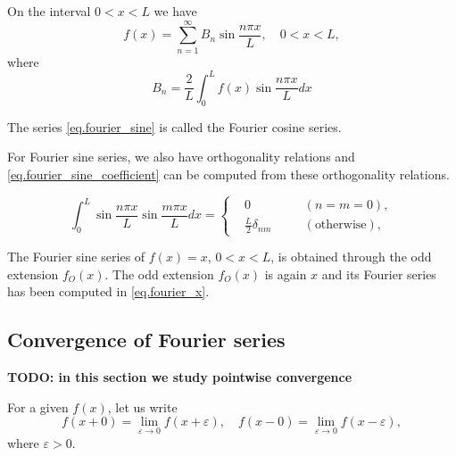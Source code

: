 On the interval $0<x<L$ we have
\begin{equation}\label{eq.fourier_sine}
    f(x)=\sum_{n=1}^{\infty} B_n \sin \frac{n \pi x}{L}, \quad 0<x<L,
\end{equation}
where
\begin{equation}\label{eq.fourier_sine_coefficient}
    B_n=\frac{2}{L} \int_0^L f(x) \sin \frac{n \pi x}{L} d x
\end{equation}

\begin{definition}[]
    The series \eqref{eq.fourier_sine} is called the Fourier cosine series.
\end{definition}

For Fourier sine series, we also have orthogonality relations and \eqref{eq.fourier_sine_coefficient} can be computed from these orthogonality relations.

\begin{theorem}
    \begin{equation}\label{eq.sine_orthogonality}
        \int_{0}^L \sin \frac{n \pi x}{L} \sin \frac{m \pi x}{L} d x=\left\{
                \begin{aligned}
                &0 \quad && (n=m=0), 
                \\
                &\frac{L}{2} \delta_{n m} \quad && (\text{otherwise}),
                \end{aligned}\right.
    \end{equation}
\end{theorem}

\begin{example}
    The Fourier sine series of $f(x)=x$, $0<x<L$, is obtained through the odd extension $f_O(x)$. The odd extension $f_O(x)$ is again $x$ and its Fourier series has been computed in \eqref{eq.fourier_x}.
\end{example}


\subsection{Convergence of Fourier series}

\textbf{TODO: in this section we study pointwise convergence}

\begin{definition}
For a given $f(x)$, let us write
\begin{equation}\label{eq.left_right_limit}
    f(x+0)=\lim _{\varepsilon \rightarrow 0} f(x+\varepsilon), \quad f(x-0)=\lim _{\varepsilon \rightarrow 0} f(x-\varepsilon),
\end{equation}
where $\varepsilon>0$.
\end{definition}


